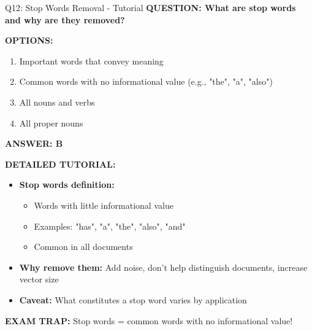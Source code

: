 \documentclass[8pt]{beamer}
\begin{document}
	\begin{frame}{Q12: Stop Words Removal - Tutorial}
		\fontsize{6.5}{7.5}\selectfont
		\textbf{QUESTION: What are stop words and why are they removed?}
		
		\vspace{0.1cm}
		\textbf{OPTIONS:}
		\begin{enumerate}
			\item Important words that convey meaning
			\item Common words with no informational value (e.g., "the", "a", "also")
			\item All nouns and verbs
			\item All proper nouns
		\end{enumerate}
		
		\vspace{0.1cm}
		\textcolor{myblue}{\textbf{ANSWER: B}}
		
		\vspace{0.1cm}
		\textbf{DETAILED TUTORIAL:}
		\begin{itemize}
			\item \textbf{Stop words definition:}
			\begin{itemize}
				\item Words with little informational value
				\item Examples: "has", "a", "the", "also", "and"
				\item Common in all documents
			\end{itemize}
			\item \textbf{Why remove them:} Add noise, don't help distinguish documents, increase vector size
			\item \textbf{Caveat:} What constitutes a stop word varies by application
		\end{itemize}
		
		\textcolor{myred}{\textbf{EXAM TRAP:}} Stop words = \textcolor{myblue}{common words with no informational value}!
	\end{frame}
	
\end{document}

